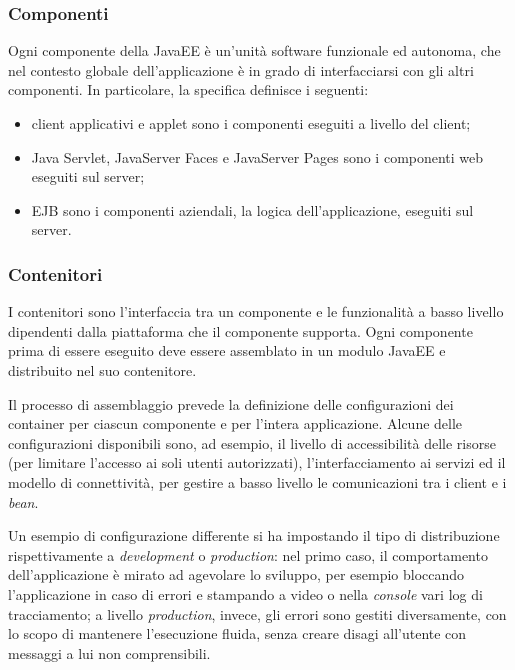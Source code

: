 \subsubsection{Componenti}
Ogni componente della JavaEE è un'unità software funzionale ed autonoma, che nel contesto globale dell'applicazione è in grado di interfacciarsi con gli altri componenti. In particolare, la specifica definisce i seguenti:
\begin{itemize}
	\item client applicativi e applet sono i componenti eseguiti a livello del client;
	\item Java Servlet, JavaServer Faces e JavaServer Pages sono i componenti web eseguiti sul server;
	\item \Gls{EJB} sono i componenti aziendali, la logica dell'applicazione, eseguiti sul server.
\end{itemize}

\subsubsection{Contenitori}
I contenitori sono l'interfaccia tra un componente e le funzionalità a basso livello dipendenti dalla piattaforma che il componente supporta. Ogni componente prima di essere eseguito deve essere assemblato in un modulo JavaEE e distribuito nel suo contenitore. 

Il processo di assemblaggio prevede la definizione delle configurazioni dei container per ciascun componente e per l'intera applicazione. Alcune delle configurazioni disponibili sono, ad esempio, il livello di accessibilità delle risorse (per limitare l'accesso ai soli utenti autorizzati), l'interfacciamento ai servizi ed il modello di connettività, per gestire a basso livello le comunicazioni tra i client e i \textit{bean}.

Un esempio di configurazione differente si ha impostando il tipo di distribuzione rispettivamente a \textit{development} o \textit{production}: nel primo caso, il comportamento dell'applicazione è mirato ad agevolare lo sviluppo, per esempio bloccando l'applicazione in caso di errori e stampando a video o nella \textit{console} vari log di tracciamento; a livello \textit{production}, invece, gli errori sono gestiti diversamente, con lo scopo di mantenere l'esecuzione fluida, senza creare disagi all'utente con messaggi a lui non comprensibili.

